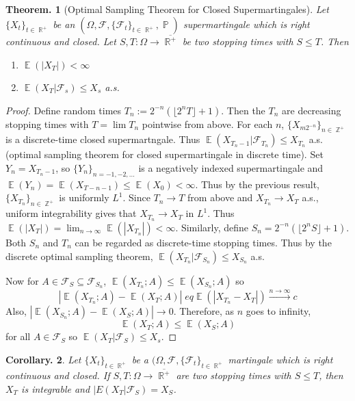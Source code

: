 \documentclass[11pt, a4paper]{memoir}
\DeclareMathOperator{\Z}{{\mathbb{Z}}}
\DeclareMathOperator{\R}{{\mathbb{R}}}
\newcommand{\fto}[1]{\ensuremath{\xrightarrow{\scriptstyle{#1}}}}
\theoremstyle{change}
\newtheorem{theorem}{Theorem.}[section]
\newtheorem{corollary}[theorem]{Corollary.}
\theoremstyle{plain}
\theoremstyle{nonumberplain}
\newtheorem{proof}{Proof}
\DeclareMathOperator{\pr}{{\mathbb{P}}}
\DeclareMathOperator{\E}{{\mathbb{E}}}
\numberwithin{equation}{section}
\begin{document}
\begin{theorem}[Optimal Sampling Theorem for Closed Supermartingales]
    Let $\{X_t\}_{t\in\R^+}$ be an $(\Omega,\mathcal{F},\{\mathcal{F}_t\}_{t\in\R^+},\pr)$ supermartingale which is right continuous and closed.
    Let $S,T:\Omega\to\overline{\R^+}$ be two stopping times with $S\leq T$.
    Then
    \begin{enumerate}[nl,r]
        \item $\E(|X_T|)<\infty$
        \item $\E(X_T|\mathcal{F}_s)\leq X_s$ a.s.
    \end{enumerate}
\end{theorem}
\begin{proof}
    Define random times $T_n:=2^{-n}(\lfloor 2^nT\rfloor+1)$.
    Then the $T_n$ are decreasing stopping times with $T=\lim T_n$ pointwise from above.
    For each $n$, $\{X_{m2^{-n}}\}_{n\in\Z^+}$ is a discrete-time closed supermartngale.
    Thus $\E(X_{T_n-1}|\mathcal{F}_{T_n})\leq X_{T_n}$ a.s. (optimal sampling theorem for closed supermartingale in discrete time).
    Set $Y_n=X_{T_n-1}$, so $\{Y_n\}_{n=-1,-2,\ldots}$ is a negatively indexed supermartingale and $\E(Y_n)=\E(X_{T-n-1})\leq\E(X_0)<\infty$.
    Thus by the previous result, $\{X_{T_n}\}_{n\in\Z^+}$ is uniformly $L^1$.
    Since $T_n\to T$ from above and $X_{T_n}\to X_T$ a.s., uniform integrability gives that $X_{T_n}\to X_T$ in $L^1$.
    Thus $\E(|X_T|)=\lim_{n\to\infty}\E(|X_{T_n}|)<\infty$.
    Similarly, define $S_n=2^{-n}(\lfloor 2^nS\rfloor+1)$.
    Both $S_n$ and $T_n$ can be regarded as discrete-time stopping times.
    Thus by the discrete optimal sampling theorem, $\E(X_{T_n}|\mathcal{F}_{S_n})\leq X_{S_n}$ a.s.

    Now for $A\in\mathcal{F}_S\subseteq\mathcal{F}_{S_n}$, $\E(X_{T_n};A)\leq\E(X_{S_n};A)$ so
    \begin{equation*}
        |\E(X_{T_n};A)-\E(X_T;A)|\;eq\E(|X_{T_n}-X_T|)\fto{n\to\infty} c
    \end{equation*}
    Also, $|\E(X_{S_n};A)-\E(X_S;A)|\to 0$.
    Therefore, as $n$ goes to infinity,
    \begin{equation*}
        \E(X_T;A)\leq\E(X_S;A)
    \end{equation*}
    for all $A\in\mathcal{F}_S$ so $\E(X_T|\mathcal{F}_S)\leq X_s$.
\end{proof}
\begin{corollary}
    Let $\{X_t\}_{t\in\R^+}$ be a $(\Omega,\mathcal{F},\{\mathcal{F}_t\}_{t\in\R^+}$ martingale which is right continuous and closed.
    If $S,T:\Omega\to\overline{\R^+}$ are two stopping times with $S\leq T$, then $X_T$ is integrable and $|E(X_T|\mathcal{F}_S)=X_S$.
\end{corollary}
\end{document}
